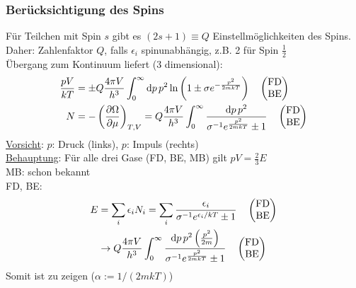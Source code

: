 \subsubsection{Berücksichtigung des Spins}
Für Teilchen mit Spin $s$ gibt es $(2s+1) \equiv Q$ Einstellmöglichkeiten des Spins. \\
Daher: Zahlenfaktor $Q$, falls $\epsilon_i$ spinunabhängig, z.B. 2 für Spin $\frac{1}{2}$ \\
Übergang zum Kontinuum liefert (3 dimensional):
\begin{equation}
    \begin{split}
\frac{p V}{k T} &= \pm Q \frac{4 \pi V}{h^3} \int_0^\infty \mathrm{d} p\, p^2 \ln \left( 1 \pm \sigma e^{- \frac{p^2}{2 m k T}} \right) \quad \begin{pmatrix} \text{FD} \\ \text{BE} \end{pmatrix} \\
N &= - \left( \frac{\partial \Omega}{\partial \mu} \right)_{T, V} = Q \frac{4 \pi V}{h^3} \int_0^\infty \frac{\mathrm{d} p \, p^2}{\sigma^{-1} e^{\frac{p^2}{2 m k T}} \pm 1} \quad \begin{pmatrix} \text{FD} \\ \text{BE} \end{pmatrix}
    \end{split}
\end{equation}
\underline{Vorsicht}: $p$: Druck (links), $p$: Impuls (rechts) \\
\underline{Behauptung}: Für alle drei Gase (FD, BE, MB) gilt $p V = \frac{2}{3} E$\\
MB: schon bekannt \\ 
FD, BE:
\begin{equation}
    \begin{split}
E &= \sum_i \epsilon_i N_i = \sum_i \frac{\epsilon_i}{\sigma^{-1} e^{\epsilon_i / k T} \pm 1} \quad \begin{pmatrix} \text{FD} \\ \text{BE} \end{pmatrix} \\
&\rightarrow Q \frac{4 \pi V}{h^3} \int_0^\infty \frac{\mathrm{d} p \, p^2 \left( \frac{p^2}{2 m} \right) }{\sigma^{-1} e^{\frac{p^2}{2 m k T}} \pm 1} \quad \begin{pmatrix} \text{FD} \\ \text{BE} \end{pmatrix}
    \end{split}
\end{equation}
Somit ist zu zeigen ($\alpha := 1/(2 m k T)$)
